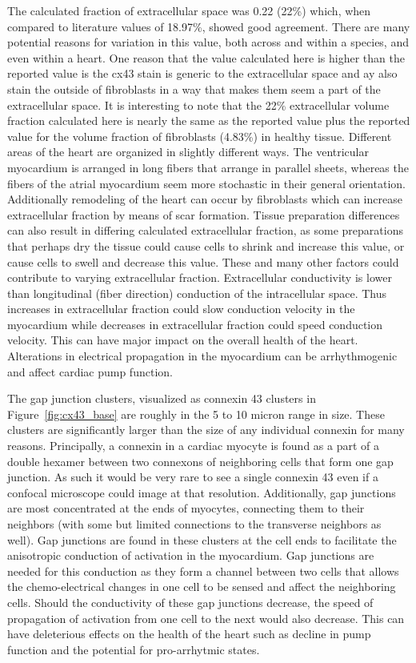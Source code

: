 \documentclass[12pt]{article}
\begin{document}
The calculated fraction of extracellular space was 0.22 (22\%) which, when compared to literature values of 18.97\%, showed good agreement.\cite{Schwab2013} There are many potential reasons for variation in this value, both across and within a species, and even within a heart. One reason that the value calculated here is higher than the reported value is the cx43 stain is generic to the extracellular space and ay also stain the outside of fibroblasts in a way that makes them seem a part of the extracellular space. It is interesting to note that the 22\% extracellular volume fraction calculated here is nearly the same as the reported value plus the reported value for the volume fraction of fibroblasts (4.83\%) in healthy tissue. Different areas of the heart are organized in slightly different ways. The ventricular myocardium is arranged in long fibers that arrange in parallel sheets, whereas the fibers of the atrial myocardium seem more stochastic in their general orientation. Additionally remodeling of the heart can occur by fibroblasts which can increase extracellular fraction by means of scar formation. Tissue preparation differences can also result in differing calculated extracellular fraction, as some preparations that perhaps dry the tissue could cause cells to shrink and increase this value, or cause cells to swell and decrease this value. These and many other factors could contribute to varying extracellular fraction. Extracellular conductivity is lower than longitudinal (fiber direction) conduction of the intracellular space. Thus increases in extracellular fraction could slow conduction velocity in the myocardium while decreases in extracellular fraction could speed conduction velocity. This can have major impact on the overall health of the heart. Alterations in electrical propagation in the myocardium can be arrhythmogenic and affect cardiac pump function.

The gap junction clusters, visualized as connexin 43 clusters in Figure~\ref{fig:cx43_base} are roughly in the 5 to 10 micron range in size. These clusters are significantly larger than the size of any individual connexin for many reasons. Principally, a connexin in a cardiac myocyte is found as a part of a double hexamer between two connexons of neighboring cells that form one gap junction. As such it would be very rare to see a single connexin 43 even if a confocal microscope could image at that resolution. Additionally, gap junctions are most concentrated at the ends of myocytes, connecting them to their neighbors (with some but limited connections to the transverse neighbors as well). Gap junctions are found in these clusters at the cell ends to facilitate the anisotropic conduction of activation in the myocardium. Gap junctions are needed for this conduction as they form a channel between two cells that allows the chemo-electrical changes in one cell to be sensed and affect the neighboring cells. Should the conductivity of these gap junctions decrease, the speed of propagation of activation from one cell to the next would also decrease. This can have deleterious effects on the health of the heart such as decline in pump function and the potential for pro-arrhytmic states.







\end{document}
